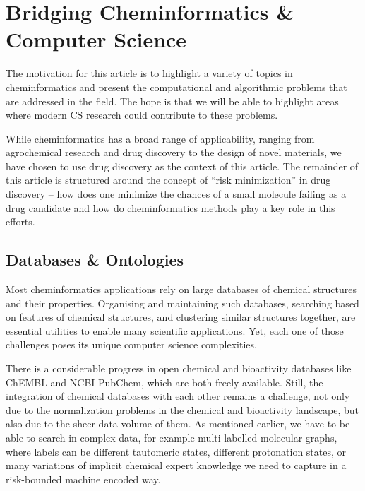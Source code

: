 \documentclass{sig-alternate}
\begin{document}
\section{Bridging Cheminformatics \& Computer Science}

The motivation for this article is to highlight a variety of topics in
cheminformatics and present the computational and algorithmic problems
that are addressed in the field. The hope is that we will be able to
highlight areas where modern CS research could contribute to these
problems.

While cheminformatics has a broad range of applicability, ranging from
agrochemical research and drug discovery to the design of novel
materials, we have chosen to use drug discovery as the context of this
article. The remainder of this article is structured around the
concept of ``risk minimization'' in drug discovery -- how does one
minimize the chances of a small molecule failing as a drug candidate
and how do cheminformatics methods play a key role in this efforts.

\subsection{Databases \& Ontologies}

Most cheminformatics applications rely on large databases of chemical structures
and their properties. Organising and maintaining such databases, searching based
on features of chemical structures, and clustering similar structures together,
are essential utilities to enable many scientific applications. Yet, each one of
those challenges poses its unique computer science complexities.

There is a considerable progress in open chemical and bioactivity databases like
ChEMBL and NCBI-PubChem, which are both freely available. Still, the integration
of chemical databases with each other remains a challenge, not only due to the
normalization problems in the chemical and bioactivity landscape, but also due
to the sheer data volume of them. As mentioned earlier, we have to be able to
search in complex data, for example multi-labelled molecular graphs, where
labels can be different tautomeric states, different protonation states, or many
variations of implicit chemical expert knowledge we need to capture in a
risk-bounded machine encoded way.
\end{document}
